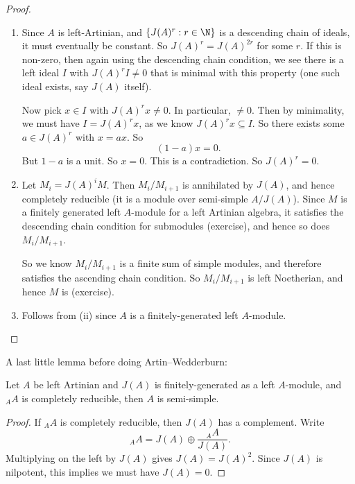 \documentclass[a4paper]{article}
\begin{document}
\begin{proof}\leavevmode
  \begin{enumerate}
    \item Since $A$ is left-Artinian, and $\{J(A)^r: r \in \N\}$ is a descending chain of ideals, it must eventually be constant. So $J(A)^r = J(A)^{2r}$ for some $r$. If this is non-zero, then again using the descending chain condition, we see there is a left ideal $I$ with $J(A)^r I \not= 0$ that is minimal with this property (one such ideal exists, say $J(A)$ itself).

      Now pick $x \in I$ with $J(A)^r x \not = 0$. In particular, $\not= 0$. Then by minimality, we must have $I = J(A)^r x$, as we know $J(A)^r x \subseteq I$. So there exists some $a \in J(A)^r$ with $x = ax$. So
      \[
        (1 - a) x = 0.
      \]
      But $1 - a$ is a unit. So $x = 0$. This is a contradiction. So $J(A)^r = 0$.
    \item Let $M_i = J(A)^i M$. Then $M_i/M_{i + 1}$ is annihilated by $J(A)$, and hence completely reducible (it is a module over semi-simple $A/J(A)$). Since $M$ is a finitely generated left $A$-module for a left Artinian algebra, it satisfies the descending chain condition for submodules (exercise), and hence so does $M_i/M_{i + 1}$. %

      So we know $M_i/M_{i + 1}$ is a finite sum of simple modules, and therefore satisfies the ascending chain condition. So $M_i/M_{i + 1}$ is left Noetherian, and hence $M$ is (exercise).

    \item Follows from (ii) since $A$ is a finitely-generated left $A$-module.
  \end{enumerate}
\end{proof}

A last little lemma before doing Artin--Wedderburn:
\begin{lemma}
  Let $A$ be left Artinian and $J(A)$ is finitely-generated as a left $A$-module, and $_AA$ is completely reducible, then $A$ is semi-simple.
\end{lemma}

\begin{proof}
  If $_AA$ is completely reducible, then $J(A)$ has a complement. Write
  \[
    _A A = J(A) \oplus \frac{_AA}{J(A)}.
  \]
  Multiplying on the left by $J(A)$ gives $J(A) = J(A)^2$. Since $J(A)$ is nilpotent, this implies we must have $J(A) = 0$. %
\end{proof}
\end{document}
